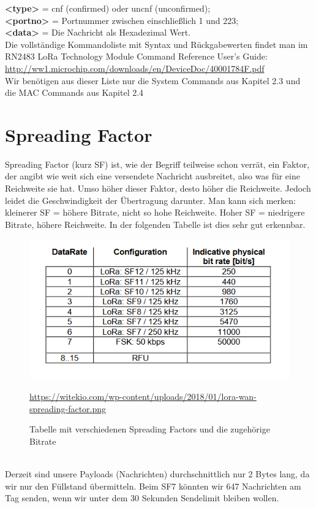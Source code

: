 \textbf{<type>} = cnf (confirmed) oder uncnf (unconfirmed);\\

\textbf{<portno>} = Portnummer zwischen einschließlich 1 und 223;\\

\textbf{<data>} = Die Nachricht als Hexadezimal Wert.\\

Die vollständige Kommandoliste mit Syntax und Rückgabewerten findet man im RN2483 LoRa Technology Module Command Reference User’s Guide: \url{http://ww1.microchip.com/downloads/en/DeviceDoc/40001784F.pdf}\\
Wir benötigen aus dieser Liste nur die System Commands aus Kapitel 2.3 und die MAC Commands aus Kapitel 2.4

\section{Spreading Factor}
Spreading Factor (kurz SF) ist, wie der Begriff teilweise schon verrät, ein Faktor, der angibt wie weit sich eine versendete Nachricht ausbreitet, also was für eine Reichweite sie hat. Umso höher dieser Faktor, desto höher die Reichweite. Jedoch leidet die Geschwindigkeit der Übertragung darunter. Man kann sich merken: kleinerer SF = höhere Bitrate, nicht so hohe Reichweite. Hoher SF = niedrigere Bitrate, höhere Reichweite. In der folgenden Tabelle ist dies sehr gut erkennbar. 
\begin{figure}[ht]
    \center
    \includegraphics[width=15cm]{Bilder/lora-10.png}\\
    \caption{Tabelle mit verschiedenen Spreading Factors und die zugehörige Bitrate}
    \begin{center} \quelle\url{https://witekio.com/wp-content/uploads/2018/01/lora-wan-spreading-factor.png} \end{center}
        \label{fig:spreading-factor}
\end{figure}\\
Derzeit sind unsere Payloads (Nachrichten) durchschnittlich nur 2 Bytes lang, da wir nur den Füllstand übermitteln. Beim SF7 könnten wir 647 Nachrichten am Tag senden, wenn wir unter dem 30 Sekunden Sendelimit bleiben wollen.\\

